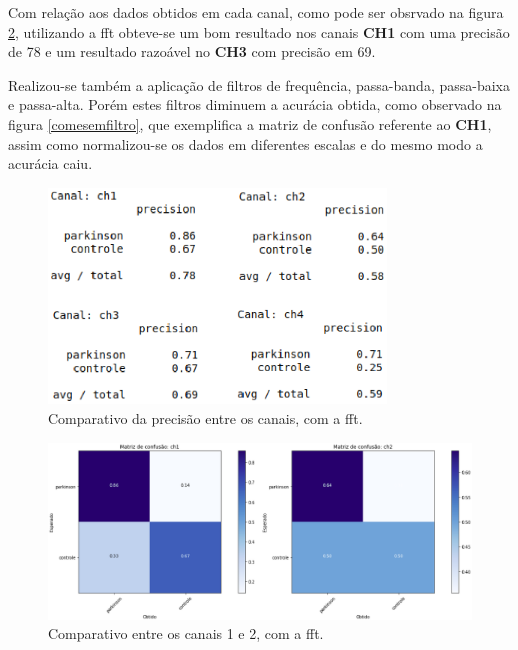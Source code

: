 Com relação aos dados obtidos em cada canal, como pode ser obsrvado na figura \ref{fcomparativo}, utilizando a fft obteve-se um bom resultado nos canais \textbf{CH1} com uma precisão de 78 e um resultado razoável no \textbf{CH3} com precisão em 69.

Realizou-se também a aplicação de filtros de frequência, passa-banda, passa-baixa e passa-alta. Porém estes filtros diminuem a acurácia obtida, como observado na figura \ref{comesemfiltro}, que exemplifica a matriz de confusão referente ao \textbf{CH1}, assim como normalizou-se os dados em diferentes escalas e do mesmo modo a acurácia caiu.

\begin{figure}[!htb]
    \centering
    \includegraphics[width=0.8\textwidth]{figuras/fcomparativo.eps}
    \caption{Comparativo da precisão entre os canais, com a fft.}
    \label{fcomparativo}
\end{figure}

\begin{figure}[!htb]
    \centering
    \includegraphics[width=1.1\textwidth]{figuras/CH12Comp.eps}
    \caption{Comparativo entre os canais 1 e 2, com a fft.}
    \label{fcomparativo}
\end{figure}

